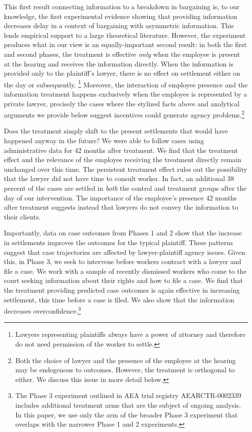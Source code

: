 \documentclass[11pt, a4paper]{article}
\begin{document}
This first result connecting information to a breakdown in bargaining is, to our knowledge, the first experimental evidence showing that providing information decreases delay in a context of bargaining with asymmetric information. This lends empirical support to a large theoretical literature. However, the experiment produces what in our view is an equally-important second result: in both the first and second phases, the treatment is effective \textit{only} when the employee is present at the hearing and receives the information directly. When the information is provided only to the plaintiff's lawyer, there is no effect on settlement either on the day or subsequently.  \footnote{Lawyers representing plaintiffs always have a power of attorney and therefore do not need permission of the worker to settle.} Moreover, the interaction of employee presence and the information treatment happens exclusively when the employee is represented by a private lawyer, precisely the cases where the stylized facts above and analytical arguments we provide below suggest incentives could generate agency problems.\footnote{Both the choice of lawyer and the presence of the employee at the hearing may be endogenous to outcomes. However, the treatment is orthogonal to either. We discuss this issue in more detail below.} 

Does the treatment simply shift to the present settlements that would have happened anyway in the future? We were able to follow cases using administrative data for 42 months after treatment. We find that the treatment effect and the relevance of the employee receiving the treatment directly remain unchanged over this time. The persistent treatment effect rules out the possibility that the lawyer did not have time to consult worker. In fact, an additional 38 percent of the cases are settled in \textit{both} the control and treatment groups after the day of our intervention. The importance of the employee's presence 42 months after treatment suggests instead that lawyers do not convey the information to their clients. %

Importantly, data on case outcomes from Phases 1 and 2 show that the increase in settlements improves the outcomes for the typical plaintiff. These patterns suggest that case trajectories are affected by lawyer-plaintiff agency issues. Given this, in Phase 3, we seek to intervene before workers contract with a lawyer and file a case. We work with a sample of recently dismissed workers who come to the court seeking information about their rights and how to file a case. We find that the treatment providing predicted case outcomes is again effective in increasing settlement, this time before a case is filed. We also show that the information decreases overconfidence.\footnote{The Phase 3 experiment outlined in AEA trial registry AEARCTR-0002339 includes additional treatment arms that are the subject of ongoing analysis. In this paper, we use only the arm of the broader Phase 3 experiment that overlaps with the narrower Phase 1 and 2 experiments.}
 
\end{document}
